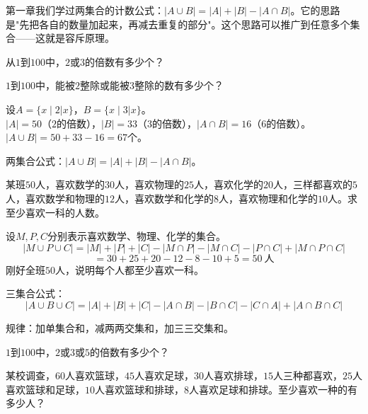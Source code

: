 
第一章我们学过两集合的计数公式：$|A\cup B| = |A| + |B| - |A\cap B|$。它的思路是"先把各自的数量加起来，再减去重复的部分"。这个思路可以推广到任意多个集合——这就是容斥原理。


从$1$到$100$中，$2$或$3$的倍数有多少个？

\begin{example}
$1$到$100$中，能被$2$整除或能被$3$整除的数有多少个？
\end{example}
\begin{solution}
设$A=\{x\mid2|x\}$，$B=\{x\mid3|x\}$。\\
$|A| = 50$（$2$的倍数），$|B| = 33$（$3$的倍数），$|A\cap B| = 16$（$6$的倍数）。\\
$|A\cup B| = 50 + 33 - 16 = 67$个。
\end{solution}

两集合公式：$|A\cup B| = |A| + |B| - |A\cap B|$。


\begin{example}
某班$50$人，喜欢数学的$30$人，喜欢物理的$25$人，喜欢化学的$20$人，三样都喜欢的$5$人，喜欢数学和物理的$12$人，喜欢数学和化学的$8$人，喜欢物理和化学的$10$人。求至少喜欢一科的人数。
\end{example}
\begin{solution}
设$M,P,C$分别表示喜欢数学、物理、化学的集合。
\[
|M\cup P\cup C| = |M|+|P|+|C| - |M\cap P|-|M\cap C|-|P\cap C| + |M\cap P\cap C|
\]
\[
= 30+25+20 -12-8-10 + 5 = 50\ \text{人}
\]
刚好全班$50$人，说明每个人都至少喜欢一科。
\end{solution}

三集合公式：
\[
|A\cup B\cup C| = |A|+|B|+|C| - |A\cap B| - |B\cap C| - |C\cap A| + |A\cap B\cap C|
\]

规律：加单集合和，减两两交集和，加三三交集和。

\begin{exercise}
\item $1$到$100$中，$2$或$3$或$5$的倍数有多少个？
\item 某校调查，$60$人喜欢篮球，$45$人喜欢足球，$30$人喜欢排球，$15$人三种都喜欢，$25$人喜欢篮球和足球，$10$人喜欢篮球和排球，$8$人喜欢足球和排球。至少喜欢一种的有多少人？
\end{exercise}


